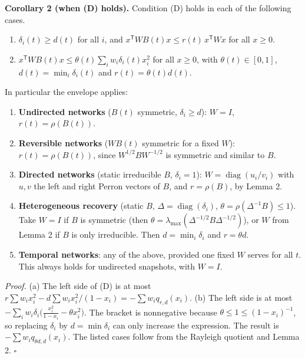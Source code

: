 \documentclass[
  11pt,
  a4paper,
]{article}
\providecommand{\tightlist}{%
  \setlength{\itemsep}{0pt}\setlength{\parskip}{0pt}}
\begin{document}
\textbf{Corollary 2 (when (D) holds).} Condition (D) holds in each of
the following cases.

\begin{enumerate}
\def\labelenumi{(\alph{enumi})}
\item
  \(\delta_i(t)\ge d(t)\) for all \(i\), and
  \(x^{\mathsf T}WB(t)x\le r(t)\,x^{\mathsf T}Wx\) for all \(x\ge0\).
\item
  \(x^{\mathsf T}WB(t)x\le\theta(t)\sum_iw_i\delta_i(t)x_i^2\) for all
  \(x\ge0\), with \(\theta(t)\in[0,1]\), \(d(t)=\min_i\delta_i(t)\) and
  \(r(t)=\theta(t)d(t)\).
\end{enumerate}

In particular the envelope applies:

\begin{enumerate}
\def\labelenumi{\arabic{enumi}.}
\tightlist
\item
  \textbf{Undirected networks} (\(B(t)\) symmetric, \(\delta_i\ge d\)):
  \(W=I\), \(r(t)=\rho(B(t))\).
\item
  \textbf{Reversible networks} (\(WB(t)\) symmetric for a fixed \(W\)):
  \(r(t)=\rho(B(t))\), since \(W^{1/2}BW^{-1/2}\) is symmetric and
  similar to \(B\).
\item
  \textbf{Directed networks} (static irreducible \(B\), \(\delta_i=1\)):
  \(W=\operatorname{diag}(u_i/v_i)\) with \(u,v\) the left and right
  Perron vectors of \(B\), and \(r=\rho(B)\), by Lemma 2.
\item
  \textbf{Heterogeneous recovery} (static \(B\),
  \(\Delta=\operatorname{diag}(\delta_i)\),
  \(\theta=\rho(\Delta^{-1}B)\le1\)). Take \(W=I\) if \(B\) is symmetric
  (then \(\theta=\lambda_{\max}(\Delta^{-1/2}B\Delta^{-1/2})\)), or
  \(W\) from Lemma 2 if \(B\) is only irreducible. Then
  \(d=\min_i\delta_i\) and \(r=\theta d\).
\item
  \textbf{Temporal networks}: any of the above, provided one fixed \(W\)
  serves for all \(t\). This always holds for undirected snapshots, with
  \(W=I\).
\end{enumerate}

\emph{Proof.} (a) The left side of (D) is at most
\(r\sum w_ix_i^2-d\sum w_ix_i^2/(1-x_i)=-\sum w_iq_{r,d}(x_i)\). (b) The
left side is at most
\(-\sum_iw_i\delta_i\big(\frac{x_i^2}{1-x_i}-\theta x_i^2\big)\). The
bracket is nonnegative because \(\theta\le1\le(1-x_i)^{-1}\), so
replacing \(\delta_i\) by \(d=\min\delta_i\) can only increase the
expression. The result is \(-\sum w_iq_{\theta d,d}(x_i)\). The listed
cases follow from the Rayleigh quotient and Lemma 2. \(\square\)
\end{document}
